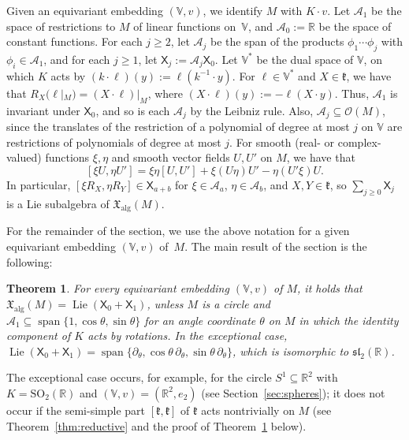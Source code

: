 \documentclass{article}
\newcommand{\R}{\mathbb{R}}
\newcommand{\frakk}{\mathfrak{k}}
\newcommand{\xalg}{\mathfrak X_{\mathrm{alg}}}
\newcommand{\sX}{\mathsf{X}}
\newcommand{\Ocal}{\mathcal{O}}
\newtheorem{theorem}{Theorem}
\theoremstyle{definition}
\theoremstyle{plain}
\begin{document}
Given an equivariant embedding $(\mathbb V,v)$, we identify $M$ with $K\cdot v$.
Let $\mathcal A_1$ be the space of restrictions to $M$ of linear functions on~$\mathbb V$, and $\mathcal A_0:=\R$ be the space of constant functions.
For each $j\geq2$, let $\mathcal A_j$ be the span of the products $\phi_1\cdots\phi_j$ with $\phi_i\in\mathcal A_1$, and for each $j\geq1$, let $\sX_j:=\mathcal A_j\sX_0$.
Let $\mathbb V^*$ be the dual space of $\mathbb V$, on which $K$ acts by $(k\cdot\ell)(y):=\ell(k^{-1}\cdot y)$.
For $\ell\in \mathbb V^*$ and $X\in\frakk$, we have that $R_X(\ell |_M)=(X\cdot\ell) |_M$, where $(X\cdot\ell)(y):=-\ell(X\cdot y)$.
Thus, $\mathcal A_1$ is invariant under $\sX_0$, and so is each $\mathcal A_j$ by the Leibniz rule.
Also, $\mathcal A_j\subseteq\Ocal(M)$, since the translates of the restriction of a polynomial of degree at most $j$ on $\mathbb V$ are restrictions of polynomials of degree at most $j$.
For smooth (real- or complex-valued) functions $\xi,\eta$ and smooth vector fields $U,U'$ on $M$, we have that
\begin{equation}\label{eq:bracket-degree}
[\xi U,\eta U']=\xi\eta[U,U']+\xi(U\eta)U'-\eta(U'\xi)U.
\end{equation}
In particular, $[\xi R_X,\eta R_Y]\in\sX_{a+b}$ for $\xi\in\mathcal A_a$, $\eta\in\mathcal A_b$, and $X,Y\in\frakk$, so $\sum_{j\geq0}\sX_j$ is a Lie subalgebra of $\xalg(M)$.

For the remainder of the section, we use the above notation for a given equivariant embedding $(\mathbb V,v)$ of~$M$.
The main result of the section is the following:

\begin{theorem}\label{thm:every-embedding}
For every equivariant embedding $(\mathbb V,v)$ of $M$, it holds that $\xalg(M)=\operatorname{Lie}(\sX_0+\sX_1)$, unless $M$ is a circle and $\mathcal A_1\subseteq\operatorname{span}\{1,\cos\theta,\sin\theta\}$ for an angle coordinate $\theta$ on $M$ in which the identity component of $K$ acts by rotations.
In the exceptional case, $\operatorname{Lie}(\sX_0+\sX_1)=\operatorname{span}\{\partial_\theta,\cos\theta\,\partial_\theta,\sin\theta\,\partial_\theta\}$, which is isomorphic to $\mathfrak{sl}_2(\R)$.
\end{theorem}


The exceptional case occurs, for example, for the circle $S^1\subseteq\R^2$ with $K=\mathrm{SO}_2(\R)$ and $(\mathbb V,v)=(\R^2,e_2)$ (see Section~\ref{sec:spheres}); it does not occur if the semi-simple part $[\frakk,\frakk]$ of $\frakk$ acts nontrivially on $M$ (see Theorem~\ref{thm:reductive} and the proof of Theorem~\ref{thm:every-embedding} below).
\end{document}

